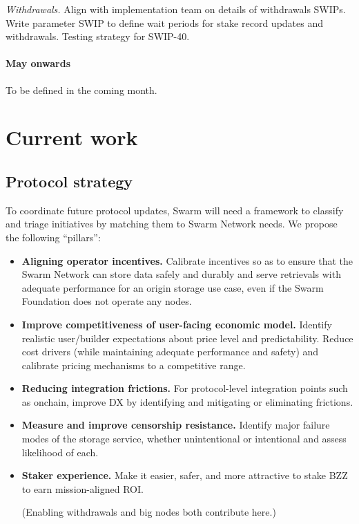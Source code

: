 \emph{Withdrawals.} Align with implementation team on details of withdrawals SWIPs. Write parameter SWIP to define wait periods for stake record updates and withdrawals. Testing strategy for SWIP-40.

\paragraph{May onwards}
%
To be defined in the coming month.

\newpage
\section*{Current work}

\subsection*{Protocol strategy}
%
To coordinate future protocol updates, Swarm will need a framework to classify and triage initiatives by matching them to Swarm Network needs.
%
We propose the following ``pillars'':

\begin{itemize}
  \item \textbf{Aligning operator incentives.} 
    Calibrate incentives so as to ensure that the Swarm Network can store data safely and durably and serve retrievals with adequate performance for an origin storage use case, even if the Swarm Foundation does not operate any nodes.
  \item \textbf{Improve competitiveness of user-facing economic model.} 
    Identify realistic user/builder expectations about price level and predictability. Reduce cost drivers (while maintaining adequate performance and safety) and calibrate pricing mechanisms to a competitive range.
  \item \textbf{Reducing integration frictions.} 
    For protocol-level integration points such as onchain, improve DX by identifying and mitigating or eliminating frictions.
  \item \textbf{Measure and improve censorship resistance.} 
    Identify major failure modes of the storage service, whether unintentional or intentional and assess likelihood of each. 
  \item \textbf{Staker experience.} 
    Make it easier, safer, and more attractive to stake BZZ to earn mission-aligned ROI.

    (Enabling withdrawals and big nodes both contribute here.)
\end{itemize}

